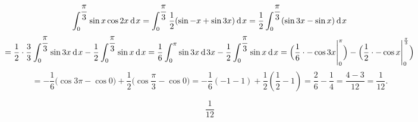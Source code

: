{}

$$
  \int^{\dfrac{\pi}{3}}_0 \sin{x}\cos{2x}\hspace{2pt}\text{d}\hspace{1pt}{x}
  = \int^{\dfrac{\pi}{3}}_0 \dfrac{1}{2} ( \sin{-x} + \sin{3x} ) \hspace{2pt}\text{d}\hspace{1pt}{x}
  = \dfrac{1}{2} \int^{\dfrac{\pi}{3}}_0 (\sin{3x}-\sin{x}) \hspace{2pt}\text{d}\hspace{1pt}{x}
$$
$$
= \dfrac{1}{2} \cdot \dfrac{3}{3} \int^{\dfrac{\pi}{3}}_0 \sin{3x} \hspace{2pt}\text{d}\hspace{1pt}{x} - \dfrac{1}{2} \int^{\dfrac{\pi}{3}}_0 \sin{x} \hspace{2pt}\text{d}\hspace{1pt}{x}
= \dfrac{1}{6} \int^{\pi}_0 \sin{3x} \hspace{2pt}\text{d}\hspace{1pt}{3x} - \dfrac{1}{2} \int^{\dfrac{\pi}{3}}_0 \sin{x} \hspace{2pt}\text{d}\hspace{1pt}{x}
=  \Big( \dfrac{1}{6} \cdot -\cos{3x} \Bigg |^{\pi}_0 \Big) - \Big (\dfrac{1}{2} \cdot -\cos{x} \Bigg |^{\frac{\pi}{3}}_0 \Big )
$$
$$
= - \dfrac{1}{6} \Big( \cos{3\pi} - \cos{0} \Big) + \dfrac{1}{2} \Big( \cos{\frac{\pi}{3}} - \cos{0} \Big)
= - \dfrac{1}{6} (-1 - 1) + \dfrac{1}{2} ( \dfrac{1}{2} - 1)
= \dfrac{2}{6} - \dfrac{1}{4} = \dfrac{4-3}{12} = \dfrac{1}{12}.
$$

$$
\boxed{\dfrac{1}{12}}
$$
